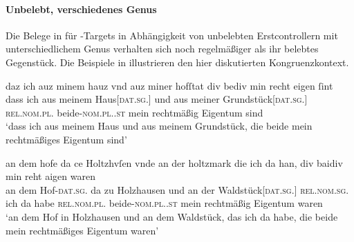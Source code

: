 %

\paragraph{Unbelebt, verschiedenes Genus}

Die Belege in  für -Targets in
Abhängigkeit von unbelebten Erstcontrollern mit unterschiedlichem Genus
verhalten sich noch regelmäßiger als ihr belebtes Gegenstück. Die Beispiele in
 illustrieren den hier diskutierten
Kongruenzkontext.

\begin{exe}
\ex \label{ex:cao_diffgend_inan}
	\begin{xlist}
	\ex \label{ex:cao_diffgend_inan_1}
		\gll daz ich auz minem hauz vnd auz miner hofſtat
			div bediv min recht eigen ſint \\
			dass ich aus meinem Haus[\textsc{dat.sg.\NeutI}] und aus meiner
			Grundstück[\textsc{dat.sg.\FemI}] \textsc{rel.nom.pl.\NeutI}
			beide-\textsc{nom.pl.\NeutI.st} mein rechtmäßig Eigentum sind \\
		\trans `dass ich aus meinem Haus und aus meinem Grundstück, die 
			beide mein rechtmäßiges Eigentum sind'
			\parencites(Nr.~1282, Regensburg, 1290)[526,37--38]{cao2}

	\ex \label{ex:cao_diffgend_inan_2}
		\gll an dem hofe da ce Holtzhvſen \textelp{} vnde an der
			holtzmark die ich da han, div baidiv min
			reht aigen waren \\
			an dem Hof-\textsc{dat.sg.\MascI} da zu Holzhausen {} und an der
			Waldstück[\textsc{dat.sg.\FemI}] \textsc{rel.nom.sg.\FemI} ich da habe
			\textsc{rel.nom.pl.\NeutI} beide-\textsc{nom.pl.\NeutI.st} mein
			rechtmäßig Eigentum waren \\
		\trans `an dem Hof in Holzhausen \textelp{} und an dem Waldstück,
			das ich da habe, die beide mein rechtmäßiges Eigentum waren'
			\parencites(Nr.~N~272, Augsburg, 1285)[215,30--31]{cao5}
	\end{xlist}
\end{exe}

